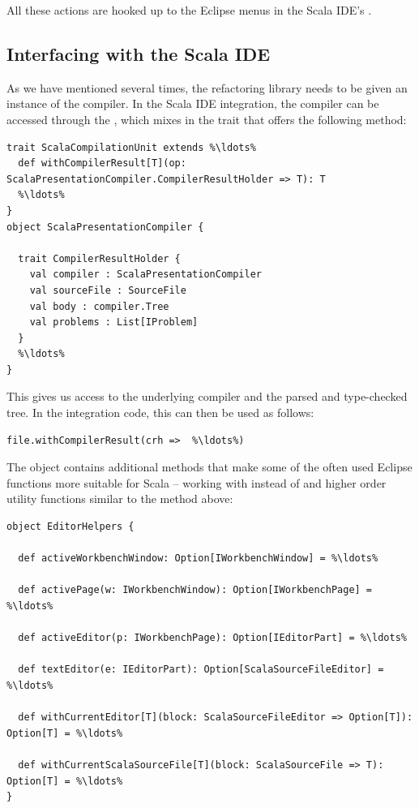 \documentclass[10pt,a4paper,oneside]{scrreprt}
\begin{document}
All these actions are hooked up to the Eclipse menus in the Scala IDE's .

\subsection{Interfacing with the Scala IDE}

As we have mentioned several times, the refactoring library needs to be given an instance of the compiler. In the Scala IDE integration, the compiler can be accessed through the , which mixes in the  trait that offers the following method:

\begin{lstlisting}
trait ScalaCompilationUnit extends %\ldots%
  def withCompilerResult[T](op: ScalaPresentationCompiler.CompilerResultHolder => T): T
  %\ldots%
}
object ScalaPresentationCompiler {
  
  trait CompilerResultHolder {
    val compiler : ScalaPresentationCompiler
    val sourceFile : SourceFile
    val body : compiler.Tree
    val problems : List[IProblem]
  }
  %\ldots%
}
\end{lstlisting}

This gives us access to the underlying compiler and the parsed and type-checked tree. In the integration code, this can then be used as follows:

\begin{lstlisting}
file.withCompilerResult(crh =>  %\ldots%)
\end{lstlisting}

The  object contains additional methods that make some of the often used Eclipse functions more suitable for Scala -- working with  instead of  and higher order utility functions similar to the  method above:

\begin{lstlisting}
object EditorHelpers {

  def activeWorkbenchWindow: Option[IWorkbenchWindow] = %\ldots%

  def activePage(w: IWorkbenchWindow): Option[IWorkbenchPage] = %\ldots%

  def activeEditor(p: IWorkbenchPage): Option[IEditorPart] = %\ldots%

  def textEditor(e: IEditorPart): Option[ScalaSourceFileEditor] = %\ldots%

  def withCurrentEditor[T](block: ScalaSourceFileEditor => Option[T]): Option[T] = %\ldots%

  def withCurrentScalaSourceFile[T](block: ScalaSourceFile => T): Option[T] = %\ldots%
}
\end{lstlisting}
\end{document}
